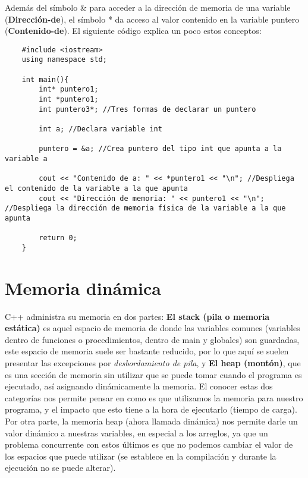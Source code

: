 Además del símbolo \& para acceder a la dirección de memoria de una variable (\textbf{Dirección-de}), el símbolo * da acceso al valor contenido en la variable puntero (\textbf{Contenido-de}). El siguiente código explica un poco estos conceptos:
\begin{lstlisting}
    #include <iostream>
    using namespace std;
    
    int main(){
        int* puntero1;
        int *puntero1;
        int puntero3*; //Tres formas de declarar un puntero
    
        int a; //Declara variable int
    
        puntero = &a; //Crea puntero del tipo int que apunta a la variable a
    
        cout << "Contenido de a: " << *puntero1 << "\n"; //Despliega el contenido de la variable a la que apunta
        cout << "Dirección de memoria: " << puntero1 << "\n"; //Despliega la dirección de memoria física de la variable a la que apunta
        
        return 0;
    }
\end{lstlisting}



\section{Memoria dinámica}
\hspace{0.55cm}C++ administra su memoria en dos partes: \textbf{El stack (pila o memoria estática)} es aquel espacio de memoria de donde las variables comunes (variables dentro de funciones o procedimientos, dentro de main y globales) son guardadas, este espacio de memoria suele ser bastante reducido, por lo que aquí se suelen presentar las excepciones por \textit{desbordamiento de pila}, y \textbf{El heap (montón)}, que es una sección de memoria sin utilizar que se puede tomar cuando el programa es ejecutado, así asignando dinámicamente la memoria. El conocer estas dos categorías nos permite pensar en como es que utilizamos la memoria para nuestro programa, y el impacto que esto tiene a la hora de ejecutarlo (tiempo de carga). Por otra parte, la memoria heap (ahora llamada dinámica) nos permite darle un valor dinámico a nuestras variables, en especial a los arreglos, ya que un problema concurrente con estos últimos es que no podemos cambiar el valor de los espacios que puede utilizar (se establece en la compilación y durante la ejecución no se puede alterar).

